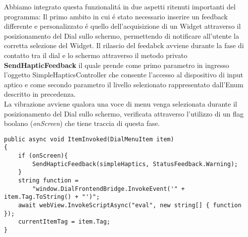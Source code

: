 Abbiamo integrato questa funzionalitá in due aspetti ritenuti importanti del programma:
Il primo ambito in cui é stato necessario inserire un feedback differente e personalizzato é quello dell'acquisizione di un Widget attraverso il posizionamento del Dial sullo schermo, permettendo di notificare all'utente la corretta selezione del Widget.
Il rilascio del feedabck avviene durante la fase di contatto tra il dial e lo schermo attraverso il metodo privato \textbf{SendHapticFeedback} il quale prende come primo parametro in ingresso l'oggetto SimpleHapticsController\cite{wdh} che consente l'accesso al dispositivo di input aptico e come secondo parametro il livello selezionato rappresentato dall'Enum descritto in precedenza.\\

La vibrazione avviene qualora una voce di menu venga selezionata durante il posizionamento del Dial sullo schermo, verificata attraverso l'utilizzo di un flag boolano (\emph{onScreen}) che tiene traccia di questa fase.

\vspace{1.0cm}
\begin{lstlisting}[caption={Rilascio feedback selezione},style=javaScriptCode]
public async void ItemInvoked(DialMenuItem item)
{
	if (onScreen){
		SendHapticFeedback(simpleHaptics, StatusFeedback.Warning);
	}
	string function = 
		"window.DialFrontendBridge.InvokeEvent('" + item.Tag.ToString() + "')";
	await webView.InvokeScriptAsync("eval", new string[] { function });
	currentItemTag = item.Tag;
} 
\end{lstlisting} 
\vspace{1.0cm}


